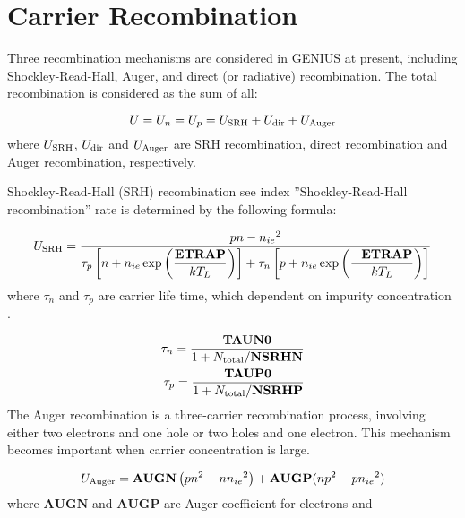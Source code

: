 \documentclass[oneside,12pt]{cgd_book}
\begin{document}
\section{Carrier Recombination}
Three recombination mechanisms are considered in GENIUS at present, including Shockley-Read-Hall, Auger, and
      direct (or radiative) recombination. The total recombination is considered as the sum of all:
\par
\begin{equation}
U = U_n = U_p = U_{\rm SRH} + U_{\rm dir} + U_{\rm Auger}
\end{equation}
where $U_{\rm SRH}$, $U_{\rm dir}$ and $U_{\rm Auger}$ are SRH recombination, direct recombination and Auger recombination,
      respectively.
\par
{}Shockley-Read-Hall (SRH) recombination see index ''Shockley-Read-Hall recombination''
rate is determined by the following formula:
\par
\par
\begin{equation}
U_{\rm SRH}=\dfrac{pn-{n_{ie}}^2}{\tau_p\left[n+n_{ie}\exp\left(\dfrac{\bf
        ETRAP}{kT_L}\right)\right]+\tau_n\left[p+n_{ie}\exp\left(\dfrac{ -{\bf ETRAP}}{kT_L}\right)\right]}
\end{equation}
where $\tau_n$ and $\tau_p$ are carrier life
      time, which dependent on impurity concentration
\cite[Roulston1982]{}.
\par
\begin{subequations}
\begin{align}
 \tau_n  =\frac{{\bf TAUN0}}{1+N_{\rm total}/ {\bf NSRHN}} \\
 \tau_p  =\frac{{\bf TAUP0}}{1+N_{\rm total}/ {\bf NSRHP}}
\end{align}
\end{subequations}
The Auger recombination
is a three-carrier recombination process, involving either two electrons and one hole or two
        holes and one electron. This mechanism becomes important when carrier concentration is large.
\par
\par
\begin{equation}
U_{\rm Auger}={\bf AUGN} \left(pn^2-n{n_{ie}}^2 \right)+{\bf AUGP}(np^2-p{{n_{ie}}^2})
\end{equation}
where $\mathbf{AUGN}$ and $\mathbf{AUGP}$ are Auger coefficient for electrons and
\end{document}
